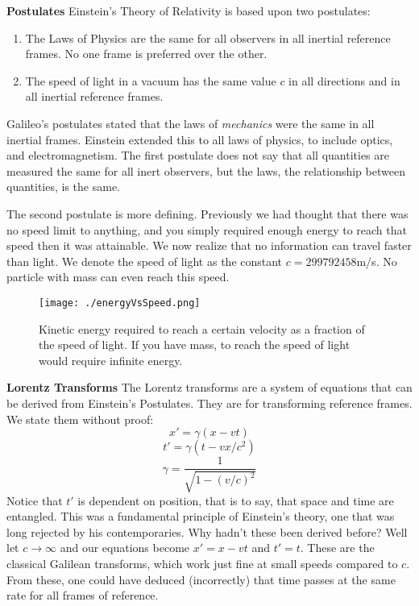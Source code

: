 \documentclass[conference]{IEEEtran}
\begin{document}
\textbf{Postulates} Einstein's Theory of Relativity is based upon two postulates: 
\begin{enumerate}
\item The Laws of Physics are the same for all observers in all inertial reference frames. No one frame is preferred over the other.
\item The speed of light in a vacuum has the same value $c$ in all directions and in all inertial reference frames.
\end{enumerate} 

Galileo's postulates stated that the laws of \textit{mechanics} were the same in all inertial frames. Einstein extended this to all laws of physics, to include optics, and electromagnetism. The first postulate does not say that all quantities are measured the same for all inert observers, but the laws, the relationship between quantities, is the same. 

The second postulate is more defining. Previously we had thought that there was no speed limit to anything, and you simply required enough energy to reach that speed then it was attainable. We now realize that no information can travel faster than light. We denote the speed of light as the constant $c = 299792458$m/s. No particle with mass can even reach this speed. \cite{einstein}
\begin{figure}[ht!]
\texttt{[image: ./energyVsSpeed.png]} 
\caption{Kinetic energy required to reach a certain velocity as a fraction of the speed of light. If you have mass, to reach the speed of light would require infinite energy.}
\end{figure}

\textbf{Lorentz Transforms} The Lorentz transforms are a system of equations that can be derived from Einstein's Postulates. They are for transforming reference frames. We state them without proof:
\begin{equation}
x' = \gamma(x - vt)
\end{equation}
\begin{equation} 
t' = \gamma(t - vx/c^2)
\end{equation}
\begin{equation}
\gamma = \frac{1}{\sqrt{1 - (v/c)^2}}
\end{equation}
Notice that $t'$ is dependent on position, that is to say, that space and time are entangled. This was a fundamental principle of Einstein's theory, one that was long rejected by his contemporaries. Why hadn't these been derived before? Well let $c \rightarrow \infty$ and our equations become $x' = x - vt$ and $t' = t$. These are the classical Galilean transforms, which work just fine at small speeds compared to $c$. From these, one could have deduced (incorrectly) that time passes at the same rate for all frames of reference. \cite{lorentz}
\end{document}
